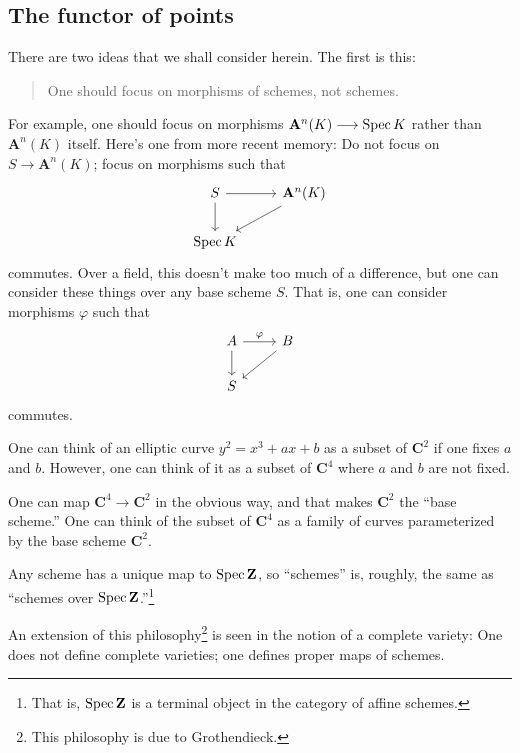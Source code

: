 \documentclass [11 pt, oneside] {article}
\begin{document}
\subsection{The functor of points}
There are two ideas that we shall consider herein. The first is this:
\begin{quote}
	\small 
	One should focus on morphisms of schemes, not schemes.
\end{quote}
For example, one should focus on morphisms $\mathbf{A}^n(K)\longrightarrow \operatorname{Spec} K$ rather than $\mathbf{A}^n(K)$ itself. Here's one from more recent memory: Do not focus on $S\longrightarrow \mathbf{A}^n(K)$; focus on morphisms such that
\[
\begin{tikzcd}
	S\ar[d] \ar[r] &\mathbf{A}^n(K)\ar[dl]\\
	\Spec K
\end{tikzcd}
\]
commutes. Over a field, this doesn't make too much of a difference, but one can consider these things over any base scheme $S$. That is, one can consider morphisms $\varphi$ such that
\[
\begin{tikzcd}
	 A\ar[r,"\varphi"]\ar[d]&B\ar[dl]\\
        S
\end{tikzcd}
\]
commutes.

\begin{example}[ ]\label{}\text{}
One can think of an elliptic curve $y^2 = x^3+ax+b$ as a subset of $\mathbf{C}^2$ if one fixes $a$ and $b$. However, one can think of it as a subset of $\mathbf{C}^4$ where $a$ and $b$ are not fixed.

One can map $\mathbf{C}^4\longrightarrow \mathbf{C}^2$ in the obvious way, and that makes $\mathbf{C}^2$ the ``base scheme.'' One can think of the subset of $\mathbf{C}^4$ as a family of curves parameterized by the base scheme $\mathbf{C}^2$.
\end{example}

\begin{remark}
	Any scheme has a unique map to $\operatorname{Spec} \mathbf{Z}$, so ``schemes'' is, roughly, the same as ``schemes over $\operatorname{Spec} \mathbf{Z}$.''\footnote{That is, $\operatorname{Spec} \mathbf{Z}$ is a terminal object in the category of affine schemes.}
\end{remark}

An extension of this philosophy\footnote{This philosophy is due to Grothendieck.} is seen in the notion of a complete variety: One does not define complete varieties; one defines proper maps of schemes.
\end{document}

